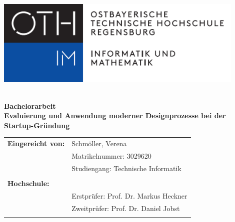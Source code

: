 \def\acroname{Titelseite}
\includegraphics[width=12cm]{99_IMG/00_img/FSIM_logo.png}
\\
\\


\vspace*{2cm}

\Huge \textbf{Bachelorarbeit} 
\vspace{2cm}
\\
\Large \textbf{Evaluierung und Anwendung moderner Designprozesse bei der Startup-Gründung} \\

\vspace{2cm}

\normalsize
\hspace{-2mm}
\begin{tabularx}{\textwidth}{l X}
	\textbf{Eingereicht von:} & Schmöller, Verena \\
							  & Matrikelnummer: 3029620 \\
							  & Studiengang: Technische Informatik \\
							  & \\
								
	\textbf{Hochschule:} & \oth \\
								& Erstprüfer: Prof. Dr. Markus Heckner \\
								& Zweitprüfer: Prof. Dr. Daniel Jobst \\
								& \\
%					 
\end{tabularx}
